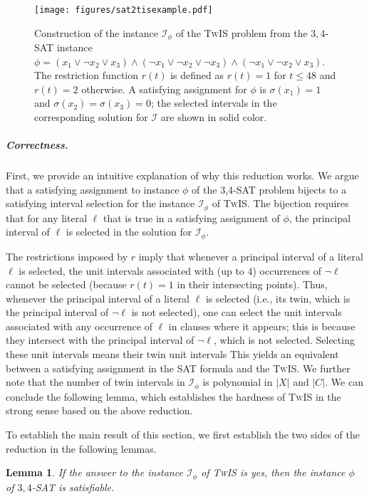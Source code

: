 \documentclass[letterpaper,11pt]{article}
\newtheorem{lemma}[theorem]{Lemma}
\newcommand{\sat}{\textsc{SAT}\xspace}
\newcommand{\sssattt}{\textsc{$3,4$-SAT}\xspace}
\newcommand{\tis}{\textsc{TwIS}\xspace}
\begin{document}
\begin{figure}
	\centering
	\texttt{[image: figures/sat2tisexample.pdf]}
	\caption{Construction of the instance $\mathcal{I}_\phi$ of the \tis problem 
    from the \sssattt instance $\phi = (x_1 \lor \neg{x_2} \lor x_3) \land (\neg{x_1} \lor \neg{x_2} \lor \neg{x_3}) \land (\neg{x_1} \lor \neg{x_2} \lor x_3) $. The restriction function $r(t)$ is defined as $r(t) = 1$ for $t \leq 48$ and $r(t) = 2$ otherwise. A satisfying assignment for $\phi$ is $\sigma(x_1)=1$ and $\sigma(x_2) = \sigma(x_3)=0$; the selected intervals in the corresponding solution for $\mathcal{I}$ are shown in solid color.}
    \label{fig:SAT2TIS-example}
\end{figure}

\subparagraph*{Correctness.}
First, we provide an intuitive explanation of why this reduction works. We argue that a satisfying assignment to instance $\phi$ of the 3,4-SAT problem bijects to a satisfying interval selection for the instance $\mathcal{I}_\phi$ of \tis. The bijection requires that for any literal $\ell$ that is true in a satisfying assignment of $\phi$, the principal interval of $\ell$ is selected in the solution for $\mathcal{I}_\phi$. 

The restrictions imposed by $r$ imply that whenever a principal interval of a literal $\ell$ is selected, the unit intervals associated with (up to $4$) occurrences of $\neg \ell$ 
cannot be selected (because $r(t) = 1$ in their intersecting points). Thus, whenever the principal interval of a literal $\ell$ is selected (i.e., its twin, which is the principal interval of $\neg \ell$ is not selected), one can select the unit intervals associated with any occurrence of $\ell$ in clauses where it appears; this is because they intersect with the principal interval of $\neg \ell$, which is not selected. Selecting these unit intervals means their twin unit intervals
This yields an equivalent between a satisfying assignment in the \sat formula and the \tis. 
We further note that the number of twin intervals in $\mathcal{I}_\phi$ is polynomial in $|X|$ and $|C|$. We can conclude the following lemma, which establishes the hardness of \tis in the strong sense based on the above reduction.

To establish the main result of this section,
we first establish the two sides of the reduction in the following lemmas. 

\begin{lemma} \label{lemma2_SATtoTIS}
If the answer to the instance $\mathcal{I}_\phi$ of \tis is yes, then the instance $\phi$ of \sssattt is satisfiable.
\end{lemma}
\end{document}
